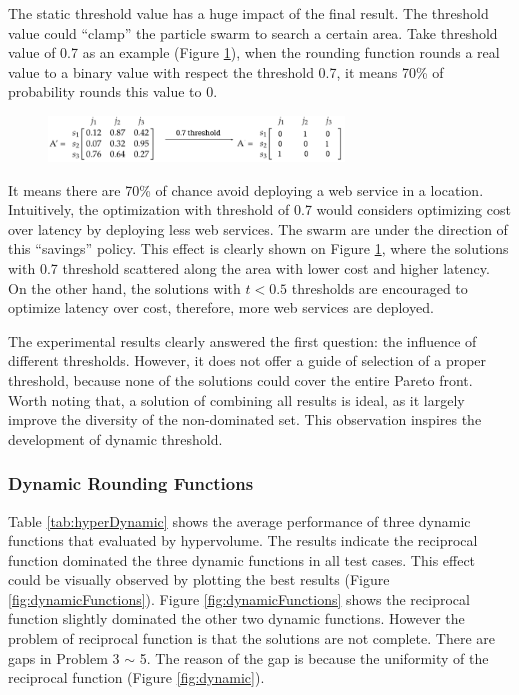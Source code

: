 The static threshold value has a huge impact of the final result. 
The threshold value could ``clamp'' the  particle swarm to search a certain area. Take threshold value of 0.7 as an example (Figure \ref{fig:roundstatic}), 
when the rounding function rounds a real value to a binary value with respect the threshold 0.7, it means 70\% of probability 
rounds this value to 0. 

\begin{figure}[H]
\centering
  \includegraphics[width=0.7\textwidth]{pics/roundstatic.png}
  \caption{}
  \label{fig:roundstatic}
\end{figure}

It means there are 70\% of chance avoid deploying a web service in a location. 
Intuitively, the optimization with threshold of 0.7 would considers optimizing cost over latency by deploying less web services. The swarm are under the 
direction of this ``savings'' policy. This effect is clearly shown on Figure \ref{fig:roundstatic}, where the solutions with 0.7 threshold 
scattered along the area with lower cost and higher latency. On the other hand, the solutions with $t< 0.5$ thresholds  are encouraged to optimize latency
over cost, therefore, more web services are deployed.

The experimental results clearly answered the first question: the influence of different thresholds. 
However, it does not offer a guide of selection of a proper threshold, because none of the solutions could cover the entire Pareto front.
Worth noting that, a solution of combining all results is ideal, as it largely improve the diversity of the non-dominated set. This observation inspires 
the development of dynamic threshold.

\subsubsection{Dynamic Rounding Functions}
\label{sec:expdy}
Table \ref{tab:hyperDynamic} shows the average performance of three dynamic functions that evaluated by hypervolume. 
The results indicate the reciprocal function dominated the three dynamic functions in all test cases. This effect could be visually observed by plotting the best results (Figure \ref{fig:dynamicFunctions}). 
Figure \ref{fig:dynamicFunctions} shows the reciprocal function slightly dominated the other two dynamic functions. 
However the problem of reciprocal function is that the solutions are not complete. There are gaps in Problem 3 $\sim$ 5. The reason of the gap is because the uniformity of the reciprocal function (Figure \ref{fig:dynamic}).

